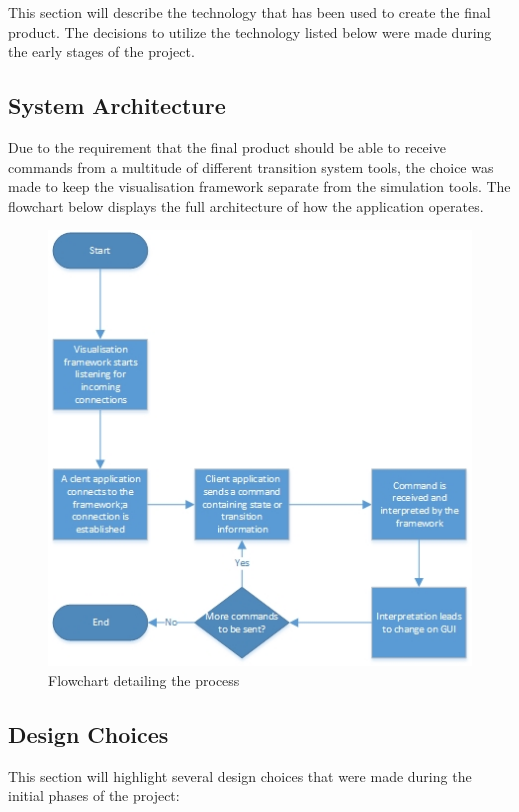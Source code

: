 \documentclass[11pt,a4paper]{article}
\begin{document}
This section will describe the technology that has been used to create the final product. The decisions to utilize the technology listed below were made during the early stages of the project.

\subsection{System Architecture}

Due to the requirement that the final product should be able to receive commands from a multitude of different
transition system tools, the choice was made to keep the visualisation framework separate from the simulation tools. The flowchart below displays the full architecture of how the application operates.

\begin{figure}[ht!]
	\centering
		\includegraphics[width=\textwidth]{Flowchart.jpg}
	\caption{Flowchart detailing the process}
\end{figure}

\subsection{Design Choices}

This section will highlight several design choices that were made during the initial phases of the project:
\end{document}
